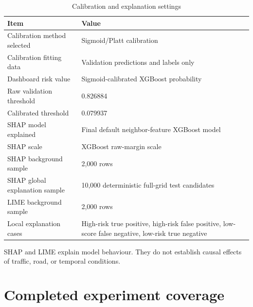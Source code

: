 \begin{table}[H]
\centering
\caption{Calibration and explanation settings}
\label{tab:appendix_explanation_settings}
\small
\begin{tabularx}{\textwidth}{L{0.34\textwidth}Y}
\toprule
\textbf{Item} & \textbf{Value} \\
\midrule
Calibration method selected & Sigmoid/Platt calibration \\
Calibration fitting data & Validation predictions and labels only \\
Dashboard risk value & Sigmoid-calibrated XGBoost probability \\
Raw validation threshold & 0.826884 \\
Calibrated threshold & 0.079937 \\
SHAP model explained & Final default neighbor-feature XGBoost model \\
SHAP scale & XGBoost raw-margin scale \\
SHAP background sample & 2,000 rows \\
SHAP global explanation sample & 10,000 deterministic full-grid test candidates \\
LIME background sample & 2,000 rows \\
Local explanation cases & High-risk true positive, high-risk false positive, low-score false negative, low-risk true negative \\
\bottomrule
\end{tabularx}
\end{table}

SHAP and LIME explain model behaviour. They do not establish causal effects of traffic, road, or temporal conditions.

\section{Completed experiment coverage}

